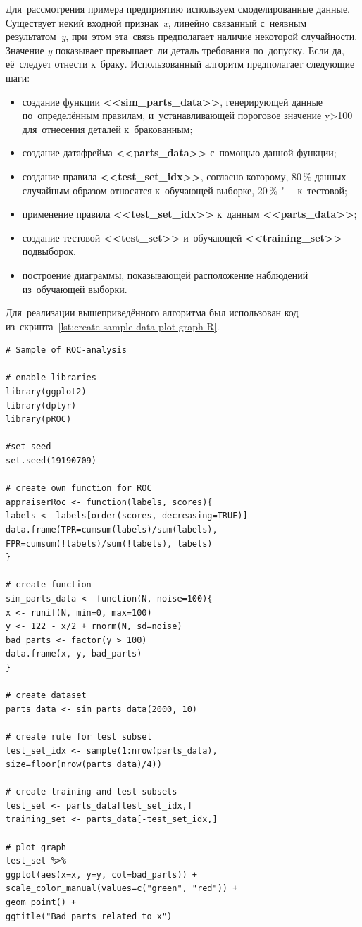 \documentclass[]{scrreprt}
\begin{document}
Для~рассмотрения примера предприятию используем смоделированные данные. Существует некий входной признак~\emph{x}, линейно связанный с~неявным результатом~\emph{y}, при~этом эта~связь предполагает наличие некоторой случайности. Значение \emph{y} показывает превышает~ли деталь требования по~допуску. Если да, её~следует отнести к~браку. Использованный алгоритм предполагает следующие шаги:
\begin{itemize}
	\item создание функции \textbf{<<sim\_parts\_data>>}, генерирующей данные по~определённым правилам, и~устанавливающей пороговое значение y>100 для~отнесения деталей к~бракованным;
	\item создание датафрейма \textbf{<<parts\_data>>} с~помощью данной функции;
	\item создание правила \textbf{<<test\_set\_idx>>}, согласно которому, 80\,\% данных случайным образом относятся к~обучающей выборке, 20\,\% "--- к~тестовой;
	\item применение правила \textbf{<<test\_set\_idx>>} к~данным \textbf{<<parts\_data>>};
	\item создание тестовой \textbf{<<test\_set>>} и~обучающей \textbf{<<training\_set>>} подвыборок.
	\item построение диаграммы, показывающей расположение наблюдений из~обучающей выборки.
\end{itemize}
Для~реализации вышеприведённого алгоритма был использован код из~скрипта~\ref{lst:create-sample-data-plot-graph-R}.
%
\begin{lstlisting}[float, caption = Создание и~первичная визуализация данных о~качественных и~бракованных деталях, firstnumber=1, label= lst:create-sample-data-plot-graph-R]
# Sample of ROC-analysis

# enable libraries
library(ggplot2)
library(dplyr)
library(pROC)

#set seed
set.seed(19190709)

# create own function for ROC
appraiserRoc <- function(labels, scores){
labels <- labels[order(scores, decreasing=TRUE)]
data.frame(TPR=cumsum(labels)/sum(labels),
FPR=cumsum(!labels)/sum(!labels), labels)
}

# create function 
sim_parts_data <- function(N, noise=100){
x <- runif(N, min=0, max=100)
y <- 122 - x/2 + rnorm(N, sd=noise)
bad_parts <- factor(y > 100)
data.frame(x, y, bad_parts)
}

# create dataset
parts_data <- sim_parts_data(2000, 10)

# create rule for test subset
test_set_idx <- sample(1:nrow(parts_data), size=floor(nrow(parts_data)/4))

# create training and test subsets
test_set <- parts_data[test_set_idx,]
training_set <- parts_data[-test_set_idx,]

# plot graph
test_set %>% 
ggplot(aes(x=x, y=y, col=bad_parts)) + 
scale_color_manual(values=c("green", "red")) + 
geom_point() + 
ggtitle("Bad parts related to x")

\end{lstlisting}
%
\end{document}
